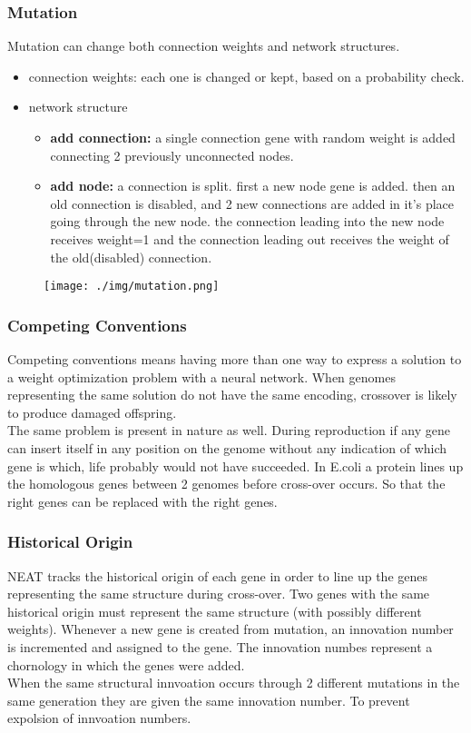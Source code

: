 \documentclass{beamer}
\begin{document}
\begin{frame}
\frametitle{Mutation}
\scriptsize
Mutation can change both connection weights and network structures.
\begin{itemize}
  \item connection weights: each one is changed or kept, based on a probability check.
  \item network structure
  \begin{itemize}
    \tiny
    \item \textbf{add connection:} a single connection gene with random weight is added connecting 2 previously unconnected nodes.
    \item \textbf{add node:} a connection is split. first a new node gene is added. then an old connection is disabled, and 2 new connections are added in it's place going through the new node. the connection leading into the new node receives weight=1 and the connection leading out receives the weight of the old(disabled) connection.
  \end{itemize}
\end{itemize}
\begin{figure}
\texttt{[image: ./img/mutation.png]}
\end{figure}
\end{frame}


\begin{frame}
\frametitle{Competing Conventions}
Competing conventions means having more than one way to express a solution to a weight optimization problem with a neural network. When genomes representing the same solution do not have the same encoding, crossover is likely to produce damaged offspring.
\\
The same problem is present in nature as well. During reproduction if any gene can insert itself in any position on the genome without any indication of which gene is which, life probably would not have succeeded. In E.coli a protein lines up the homologous genes between 2 genomes before cross-over occurs. So that the right genes can be replaced with the right genes.
\end{frame}


\begin{frame}
\frametitle{Historical Origin}
NEAT tracks the historical origin of each gene in order to line up the genes representing the same structure during cross-over. Two genes with the same historical origin must represent the same structure (with possibly different weights). Whenever a new gene is created from mutation, an innovation number is incremented and assigned to the gene. The innovation numbes represent a chornology in which the genes were added.
\\
When the same structural innvoation occurs through 2 different mutations in the same generation they are given the same innovation number. To prevent expolsion of innvoation numbers.
\end{frame}
\end{document}
